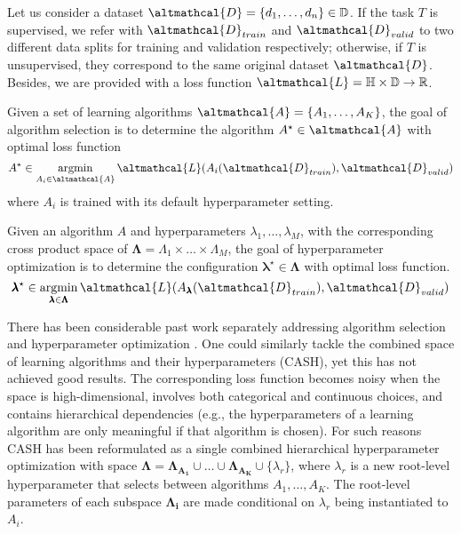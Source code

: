 Let us consider a dataset $\altmathcal{D} = \{d_1, \dots, d_n\} \in \mathbb{D}$.
If the task $T$ is supervised, we refer with $\altmathcal{D}_{train}$ and $\altmathcal{D}_{valid}$ to two different data splits for training and validation respectively; otherwise, if $T$ is unsupervised, they correspond to the same original dataset $\altmathcal{D}$.
Besides, we are provided with a loss function $\altmathcal{L} = \mathbb{H} \times \mathbb{D} \rightarrow \mathbb{R}$.

\begin{definition}
    Given a set of learning algorithms $\altmathcal{A} = \{A_1, \dots, A_K\}$, the goal of algorithm selection is to determine the algorithm $A^{\star} \in \altmathcal{A}$ with optimal loss function
    \begin{equation*}
        A^{\star} \in \argmin_{A_i \in \altmathcal{A}} \altmathcal{L}(A_i(\altmathcal{D}_{train}), \altmathcal{D}_{valid})
    \end{equation*}
    where $A_i$ is trained with its default hyperparameter setting.
\end{definition}

\begin{definition}
    Given an algorithm $A$ and hyperparameters $\lambda_1, \dots, \lambda_M$, with the corresponding cross product space of $\pmb{\Lambda} = \Lambda_1 \times \dots \times \Lambda_M$, the goal of hyperparameter optimization is to determine the configuration $\pmb{\lambda}^{\star} \in \pmb{\Lambda}$ with optimal loss function.
    \begin{equation*}
        \pmb{\lambda}^{\star} \in \argmin_{\pmb{\lambda} \in \pmb{\Lambda}} \altmathcal{L}(A_{\pmb{\lambda}}(\altmathcal{D}_{train}), \altmathcal{D}_{valid})
    \end{equation*}
\end{definition}

There has been considerable past work separately addressing algorithm selection \cite{as_algos} and hyperparameter optimization \cite{hpo_algos}.
One could similarly tackle the combined space of learning algorithms and their hyperparameters (CASH), yet this has not achieved good results.
The corresponding loss function becomes noisy when the space is high-dimensional, involves both categorical and continuous choices, and contains hierarchical dependencies (e.g., the hyperparameters of a learning algorithm are only meaningful if that algorithm is chosen).
For such reasons CASH has been reformulated as a single combined hierarchical hyperparameter optimization with space $\pmb{\Lambda} = \pmb{\Lambda_{A_1}} \cup \dots \cup \pmb{\Lambda_{A_K}} \cup \{\lambda_r\}$, where $\lambda_r$ is a new root-level hyperparameter that selects between algorithms $A_1, \dots, A_K$.
The root-level parameters of each subspace $\pmb{\Lambda_i}$ are made conditional on $\lambda_r$ being instantiated to $A_i$.

